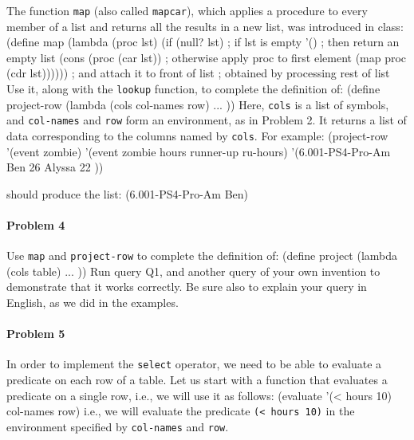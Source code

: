 The function {\tt map} (also called {\tt mapcar}), which applies a procedure
to every member of a list and returns all the results in a new list, was
introduced in class:
 \beginlisp
(define map
  (lambda (proc lst)
    (if (null? lst)                    ; if lst is empty
        '()                            ; then return an empty list
        (cons (proc (car lst))         ; otherwise apply proc to first element 
              (map proc (cdr lst)))))) ; and attach it to front of list
                                       ; obtained by processing rest of list
\endlisp
 Use it, along with the {\tt lookup} function, to complete the definition of:
 \beginlisp
(define project-row
  (lambda (cols col-names row)
    ... ))
 \endlisp
 Here, {\tt cols} is a list of symbols, and {\tt col-names} and {\tt row}
form an environment, as in Problem 2.  It returns a list of data
corresponding to the columns named by {\tt cols}. For example:
 \beginlisp
(project-row '(event zombie)
             '(event             zombie  hours  runner-up  ru-hours)
             '(6.001-PS4-Pro-Am  Ben     26     Alyssa     22      ))

 \endlisp
 should produce the list:
 \beginlisp
(6.001-PS4-Pro-Am Ben)
 \endlisp

\paragraph{Problem 4}

Use {\tt map} and {\tt project-row} to complete the definition of:
 \beginlisp
(define project
  (lambda (cols table)
    ... ))
 \endlisp
 Run query Q1, and another query of your own invention to demonstrate that it
works correctly.
Be sure also to explain your query in English, as we did in the examples.

\paragraph{Problem 5}

In order to implement the {\tt select} operator, we need to be able to
evaluate a predicate on each row of a table.  Let us start with a function
that evaluates a predicate on a single row, i.e., we will use it as follows:
 \beginlisp
(evaluate '(< hours 10)
          col-names
          row)
 \endlisp
 i.e., we will evaluate the predicate \mbox{\tt (< hours 10)} in the
environment specified by {\tt col-names} and {\tt row}.

